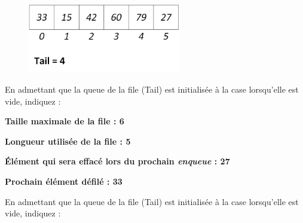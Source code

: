 \documentclass[11pt,a4paper]{article}
\begin{document}
\begin{figure}[ht!]
\centering
\centerline{  %
\includegraphics[height=3.0cm]{img/file_t_1_A.png}
}
\end{figure}

\vspace*{-0.5cm}

\begin{center}
En admettant que la queue de la file (Tail) est initialisée à la case  \fg{} lorsqu'elle est vide, indiquez :

\begin{table}[ht!]
  \centering
  \begin{minipage}{0.4\textwidth}

\textbf{Taille maximale de la file :  \hspace*{0.25cm }  6}

\bigskip

\textbf{Longueur utilisée de la file :  \hspace*{0.25cm }  5}

  \end{minipage}
  \hfillx
  \begin{minipage}{0.6\textwidth}

\textbf{\'Elément qui sera effacé lors du prochain \textit{enqueue} :    27}

\bigskip

\textbf{Prochain élément défilé :  \hspace*{0.25cm }  33}

  \end{minipage}
\end{table}


\vspace*{1cm}


En admettant que la queue de la file (Tail) est initialisée à la case  \fg{} lorsqu'elle est vide, indiquez :


\end{center}
\end{document}
